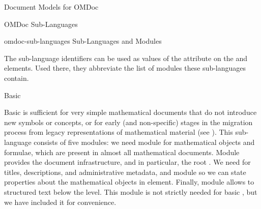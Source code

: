\begin{module}[id=document-model]
\begin{omgroup}[id=document-model]{Document Models for OMDoc}
\begin{omgroup}[id=sub-languages]{OMDoc Sub-Languages}
\begin{module}[id=sub-languages]
\begin{myfig}{omdoc-sub-languages}{{\omdoc} Sub-Languages and Modules}
\end{myfig}

The sub-language identifiers can be used as values of the {}
attribute on the {} and {} elements. Used there, they
abbreviate the list of modules these sub-languages contain.


\begin{omgroup}[id=sub-languages.basic]{Basic {\omdoc}}

Basic {\omdoc} is sufficient for very simple mathematical documents that do not introduce
new symbols or concepts, or for early (and non-specific) stages in the migration process
from legacy representations of mathematical material (see {}). This
{\omdoc} sub-language consists of five modules: we need module {} for
mathematical objects and formulae, which are present in almost all mathematical documents.
Module {} provides the document infrastructure, and in particular, the
root  {}. We need {} for
titles, descriptions, and administrative metadata, and module {} so we
can state properties about the mathematical objects in {} element.
Finally, module {} allows to structured text below the {}
level. This module is not strictly needed for basic {\omdoc}, but we have included it for
convenience.
\end{omgroup}


\end{module}
\end{omgroup}
\end{omgroup}
\end{module}

